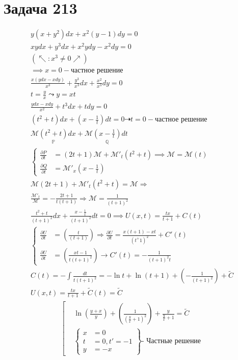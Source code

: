 \section{Задача 213}

\begin{gather}
y(x+y^2)dx+x^2(y-1)dy=0\\
xydx+y^3dx+x^2ydy-x^2dy=0\\
(\nwarrow   :x^3\neq0 \nearrow )\\ \implies \boxed{x=0-\text{частное решение}}\\
\frac{x(ydx-xdy)}{x^3}+\frac{y^3}{x^3}dx+\frac{x^2}{x^3}dy=0\\
\boxed {t=\frac{y}{x}\leadsto y=xt}\\
\frac{ydx-xdy}{x^2}+t^3dx+tdy=0\\
(t^2+t)dx + (x-\frac{1}{t})dt=0\dashrightarrow \boxed{t=0-\text{частное решение}}\\
\mathcal{M} \underset{\mathbb{P} }{(t^2+t)}dx+\mathcal{M}\underset{\mathbb{Q}}{ (x-\frac{1}{t})}dt \\
\left\{ \begin{aligned}
  \frac{\partial P}{\partial t} &= (2t+1)\mathcal{M}+\mathcal{M'}_t(t^2+t)\implies  \mathcal{M}=\mathcal{M}(t) \\
  \frac{\partial Q}{\partial t} &= \mathcal{M'}_x(x-\frac{1}{t})
\end{aligned} \right.\\
\mathcal{M}(2t+1)+\mathcal{M'}_t(t^2+t)=\mathcal{M}\Rightarrow \\
\frac{\mathcal{M}'_t}{\mathcal{M}}=-\frac{2t+1}{t(t+1)}\Longrightarrow \mathcal{M}=\frac{1}{(t+1)^2}\\
\frac{t^2+t}{(t+1)^2}dx+\frac{x-\frac{1}{t}}{(t+1)^2}dt=0\implies U(x,t)=\frac{tx}{t+1}+C(t)\\
\left\{ \begin{aligned}
  \frac{\partial U}{\partial t} &= (\frac{t}{(t+1)})\Longrightarrow \frac{\partial U}{\partial t}=\frac{x(t+1)-xt}{(t^+1)^2}+C'(t)\\
  \frac{\partial U}{\partial t} &= (\frac{xt-1}{t(t+1)^2})\rightarrow C'(t)=-\frac{1}{(t+1)^2t}
\end{aligned} \right.\\
C(t)=-\int\frac{dt}{t(t+1)^2}=-\ln t+\ln(t+1) + (-\frac{1}{(t+1)^2})+\widetilde{C}\\
U(x,t)=\frac{tx}{t+1}+\widetilde{C}(t)=\widetilde{C}
\end{gather}
\begin{gather}
\left[
    \begin{aligned}
        &\ln (\frac{y+x}{y}) +(\frac{1}{(\frac{y}{x}+1)^2})+\frac{y}{\frac{y}{x}+1} =\widetilde{C}\\
        &\left\{
            \begin{aligned}
                x &= 0 \\
                t &= 0, t' = -1 \\
                y &= -x
            \end{aligned}
        \right\} \text{- Частные решение}
    \end{aligned}    
\right.
\end{gather}



